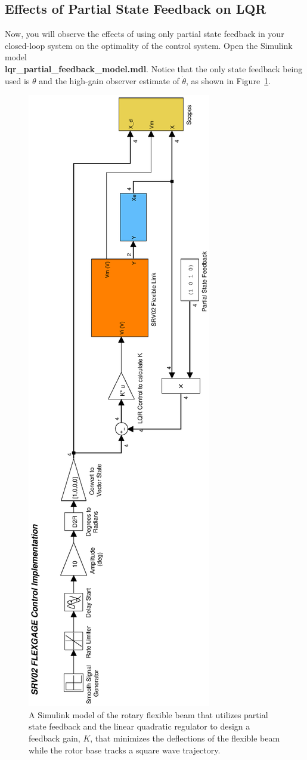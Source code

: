 \documentclass[12pt]{report}
\begin{document}
\subsection{Effects of Partial State Feedback on LQR}\label{subsubsection:lab4_partial_feedback}
Now, you will observe the effects of using only partial state feedback in your closed-loop system on the optimality of the control system. Open the Simulink model\\ \textbf{lqr\_partial\_feedback\_model.mdl}. Notice that the only state feedback being used is $\theta$ and the high-gain observer estimate of $\dot{\theta}$, as shown in Figure~\ref{lab4_lqr_partial_simulink}.
\begin{figure}[htb!]
    \includegraphics[width=0.3\linewidth,angle=-90]{eps/lab_4/lqr_partial_feedback_simulink}
    \caption{A Simulink model of the rotary flexible beam that utilizes partial state feedback and the linear quadratic regulator to design a feedback gain, $K$, that minimizes the deflections of the flexible beam while the rotor base tracks a square wave trajectory.}
    \label{lab4_lqr_partial_simulink}
\end{figure}
\end{document}
